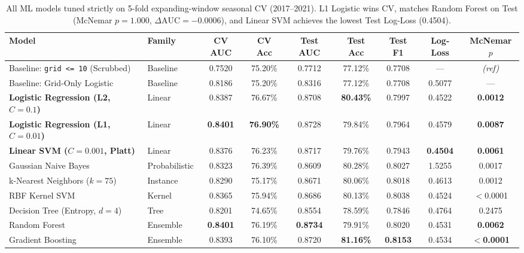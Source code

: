 \documentclass[10pt,a4paper]{article}
\begin{document}
\begin{table}[h!]
  \centering
  \footnotesize
  \setlength{\tabcolsep}{4.5pt}
  \begin{tabular}{llccccccc}
    \toprule
    \textbf{Model} & \textbf{Family} & \textbf{CV AUC} & \textbf{CV Acc} & \textbf{Test AUC} & \textbf{Test Acc} & \textbf{Test F1} & \textbf{Log-Loss} & \textbf{McNemar $p$} \\
    \midrule
    Baseline: \texttt{grid <= 10} (Scrubbed) & Baseline & 0.7520 & 75.20\% & 0.7712 & 77.12\% & 0.7708 & --- & \textit{(ref)} \\
    Baseline: Grid-Only Logistic & Baseline & 0.8186 & 75.20\% & 0.8316 & 77.12\% & 0.7708 & 0.5077 & --- \\
    \midrule
    \textbf{Logistic Regression (L2, $C=0.1$)} & Linear & 0.8387 & 76.67\% & 0.8708 & \textbf{80.43\%} & 0.7997 & 0.4522 & \textbf{0.0012} \\
    \textbf{Logistic Regression (L1, $C=0.01$)} & Linear & \textbf{0.8401} & \textbf{76.90\%} & 0.8728 & 79.84\% & 0.7964 & 0.4579 & \textbf{0.0087} \\
    \textbf{Linear SVM ($C=0.001$, Platt)} & Linear & 0.8376 & 76.23\% & 0.8717 & 79.76\% & 0.7943 & \textbf{0.4504} & \textbf{0.0061} \\
    Gaussian Naive Bayes & Probabilistic & 0.8323 & 76.39\% & 0.8609 & 80.28\% & 0.8027 & 1.5255 & 0.0017 \\
    k-Nearest Neighbors ($k=75$) & Instance & 0.8290 & 75.17\% & 0.8671 & 80.06\% & 0.8018 & 0.4613 & 0.0012 \\
    RBF Kernel SVM & Kernel & 0.8365 & 75.94\% & 0.8686 & 80.13\% & 0.8038 & 0.4524 & $<$0.0001 \\
    Decision Tree (Entropy, $d=4$) & Tree & 0.8201 & 74.65\% & 0.8554 & 78.59\% & 0.7846 & 0.4764 & 0.2475 \\
    Random Forest & Ensemble & \textbf{0.8401} & 76.19\% & \textbf{0.8734} & 79.91\% & 0.8020 & 0.4531 & \textbf{0.0062} \\
    Gradient Boosting & Ensemble & 0.8393 & 76.10\% & 0.8720 & \textbf{81.16\%} & \textbf{0.8153} & 0.4534 & \textbf{$<$0.0001} \\
    \bottomrule
  \end{tabular}
  \vspace{-4pt}
  \caption{\small All ML models tuned strictly on 5-fold expanding-window seasonal CV (2017--2021). L1 Logistic wins CV, matches Random Forest on Test (McNemar $p=1.000$, $\Delta\text{AUC}=-0.0006$), and Linear SVM achieves the lowest Test Log-Loss (0.4504).}
\end{table}
\end{document}
